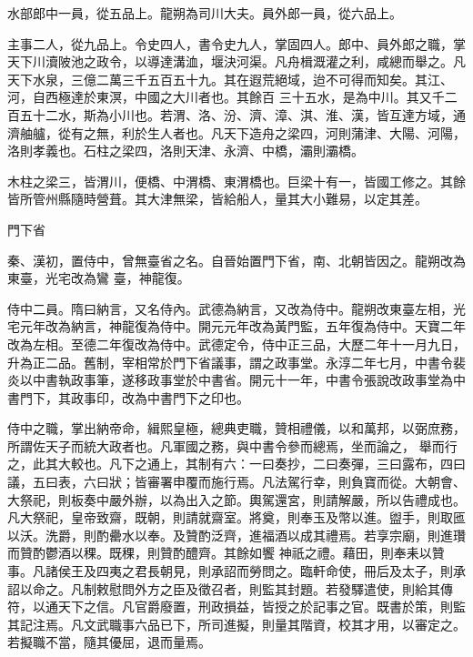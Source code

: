 \begin{pinyinscope}
 水部郎中一員，從五品上。龍朔為司川大夫。員外郎一員，從六品上。



 主事二人，從九品上。令史四人，書令史九人，掌固四人。郎中、員外郎之職，掌天下川瀆陂池之政令，以導達溝洫，堰決河渠。凡舟楫溉灌之利，咸總而舉之。凡天下水泉，三億二萬三千五百五十九。其在遐荒絕域，迨不可得而知矣。其江、河，自西極達於東溟，中國之大川者也。其餘百
 三十五水，是為中川。其又千二百五十二水，斯為小川也。若渭、洛、汾、濟、漳、淇、淮、漢，皆互達方域，通濟舳艫，從有之無，利於生人者也。凡天下造舟之梁四，河則蒲津、大陽、河陽，洛則孝義也。石柱之梁四，洛則天津、永濟、中橋，灞則灞橋。



 木柱之梁三，皆渭川，便橋、中渭橋、東渭橋也。巨梁十有一，皆國工修之。其餘皆所管州縣隨時營葺。其大津無梁，皆給船人，量其大小難易，以定其差。



 門下省



 秦、漢初，置侍中，曾無臺省之名。自晉始置門下省，南、北朝皆因之。龍朔改為東臺，光宅改為鸞
 臺，神龍復。



 侍中二員。隋曰納言，又名侍內。武德為納言，又改為侍中。龍朔改東臺左相，光宅元年改為納言，神龍復為侍中。開元元年改為黃門監，五年復為侍中。天寶二年改為左相。至德二年復改為侍中。武德定令，侍中正三品，大歷二年十一月九日，升為正二品。舊制，宰相常於門下省議事，謂之政事堂。永淳二年七月，中書令裴炎以中書執政事筆，遂移政事堂於中書省。開元十一年，中書令張說改政事堂為中書門下，其政事印，改為中書門下之印也。



 侍中之職，掌出納帝命，緝熙皇極，總典吏職，贊相禮儀，以和萬邦，以弼庶務，所謂佐天子而統大政者也。凡軍國之務，與中書令參而總焉，坐而論之，
 舉而行之，此其大較也。凡下之通上，其制有六：一曰奏抄，二曰奏彈，三曰露布，四曰議，五曰表，六曰狀；皆審署申覆而施行焉。凡法駕行幸，則負寶而從。大朝會、大祭祀，則板奏中嚴外辦，以為出入之節。輿駕還宮，則請解嚴，所以告禮成也。凡大祭祀，皇帝致齋，既朝，則請就齋室。將奠，則奉玉及幣以進。盥手，則取匜以沃。洗爵，則酌罍水以奉。及贊酌泛齊，進福酒以成其禮焉。若享宗廟，則進瓚而贊酌鬱酒以稞。既稞，則贊酌醴齊。其餘如饗
 神祇之禮。藉田，則奉耒以贊事。凡諸侯王及四夷之君長朝見，則承詔而勞問之。臨軒命使，冊后及太子，則承詔以命之。凡制敕慰問外方之臣及徵召者，則監其封題。若發驛遣使，則給其傳符，以通天下之信。凡官爵廢置，刑政損益，皆授之於記事之官。既書於策，則監其記注焉。凡文武職事六品已下，所司進擬，則量其階資，校其才用，以審定之。若擬職不當，隨其優屈，退而量焉。




\end{pinyinscope}

